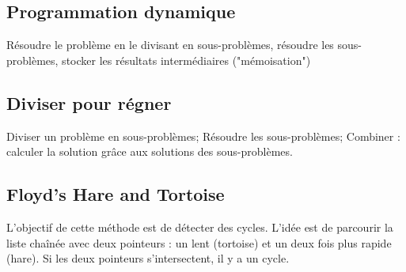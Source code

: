 \documentclass[8pt]{article}
\begin{document}
        \subsection{Programmation dynamique}
        Résoudre le problème en le divisant en sous-problèmes, résoudre les sous-problèmes, stocker les résultats
        intermédiaires ("mémoisation")
        \subsection{Diviser pour régner}
        Diviser un problème en sous-problèmes; Résoudre les sous-problèmes; Combiner : calculer la solution grâce aux
        solutions des sous-problèmes.
        \subsection{Floyd's Hare and Tortoise}
        L'objectif de cette méthode est de détecter des cycles. L'idée est de parcourir la liste chaînée
        avec deux pointeurs : un lent (tortoise) et un deux fois plus rapide (hare). Si les deux pointeurs
        s'intersectent, il y a un cycle.
\end{document}
